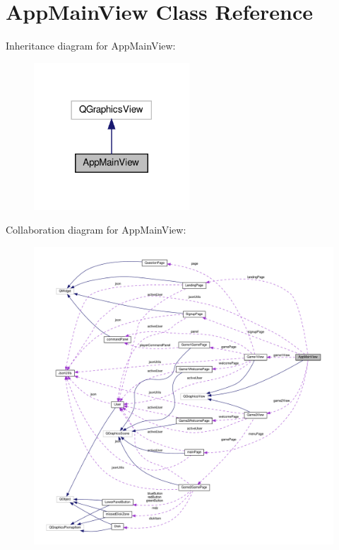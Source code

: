 \hypertarget{classAppMainView}{}\section{App\+Main\+View Class Reference}
\label{classAppMainView}


Inheritance diagram for App\+Main\+View\+:\nopagebreak
\begin{figure}[H]
\begin{center}
\leavevmode
\includegraphics[width=165pt]{classAppMainView__inherit__graph}
\end{center}
\end{figure}


Collaboration diagram for App\+Main\+View\+:
\nopagebreak
\begin{figure}[H]
\begin{center}
\leavevmode
\includegraphics[width=350pt]{classAppMainView__coll__graph}
\end{center}
\end{figure}

